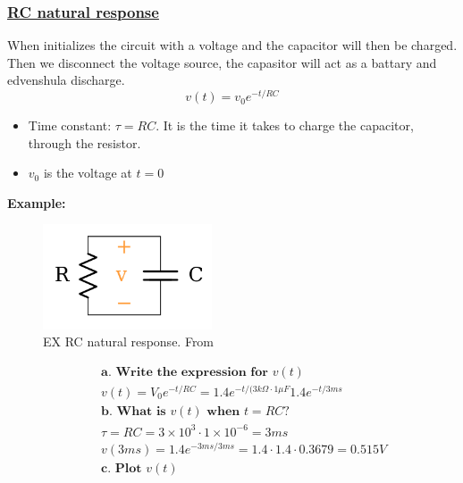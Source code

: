\subsubsection{\href{https://www.khanacademy.org/science/electrical-engineering/ee-circuit-analysis-topic/ee-natural-and-forced-response/a/ee-rc-natural-response}{RC natural response}}
When initializes the circuit with a voltage and the capacitor will then be charged. Then we disconnect
the voltage source, the capasitor will act as a battary and edvenshula discharge. 
\begin{equation}
  v(t)=v_0e^{-t/RC}
\end{equation}
\begin{itemize}
    \item Time constant: $\tau=RC$. It is the time it takes to charge the capacitor, through the resistor.
    \item $v_0$ is the voltage at $t=0$
\end{itemize}

\textbf{Example:}
\begin{figure}[h]
    \centering
    \includegraphics[width=5cm]{image/ex_RC_natural_response.png}
    \caption{EX RC natural response. From \cite{}}
\end{figure}

\begin{align*}
  &\quad  \textbf{a. Write the expression for } v(t) \\
  &\quad  v(t) = V_0e^{-t/RC} = 1.4e^{-t/(3k\Omega\cdot{1\mu{F}}} 1.4e^{-t/3ms} \\
  &\quad  \textbf{b. What is $v(t)$ when $t=RC$?} \\
  &\quad  \tau=RC=3\times10^3\cdot{1\times10^{-6}} = 3ms \\
  &\quad  v(3ms) = 1.4e^{-3ms/3ms} = 1.4\cdot{1.4\cdot{0.3679}} = 0.515V \\
  &\quad  \textbf{c. Plot } v(t) \\
\end{align*}

